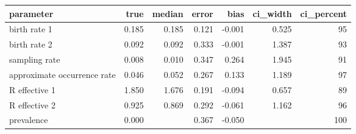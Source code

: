 \begin{table}[ht]
\centering
\begin{tabular}{lrrrrrr}
  \hline
parameter & true & median & error & bias & ci\_width & ci\_percent \\ 
  \hline
birth rate 1 & 0.185 & 0.185 & 0.121 & -0.001 & 0.525 & 95 \\ 
  birth rate 2 & 0.092 & 0.092 & 0.333 & -0.001 & 1.387 & 93 \\ 
  sampling rate & 0.008 & 0.010 & 0.347 & 0.264 & 1.945 & 91 \\ 
  approximate occurrence rate & 0.046 & 0.052 & 0.267 & 0.133 & 1.189 & 97 \\ 
  R effective 1 & 1.850 & 1.676 & 0.191 & -0.094 & 0.657 & 89 \\ 
  R effective 2 & 0.925 & 0.869 & 0.292 & -0.061 & 1.162 & 96 \\ 
  prevalence & 0.000 &  & 0.367 & -0.050 &  & 100 \\ 
   \hline
\end{tabular}
\end{table}
